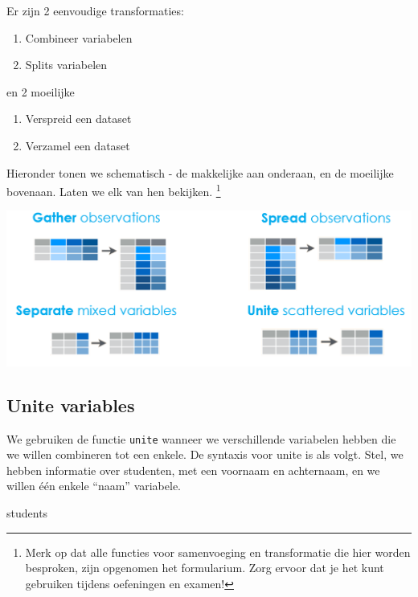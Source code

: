 \documentclass[]{tufte-book}
\newenvironment{Shaded}{}{}
\newcommand{\NormalTok}[1]{#1}
\providecommand{\tightlist}{%
  \setlength{\itemsep}{0pt}\setlength{\parskip}{0pt}}
\begin{document}
Er zijn 2 eenvoudige transformaties:

\begin{enumerate}
\def\labelenumi{\arabic{enumi}.}
\tightlist
\item
  Combineer variabelen
\item
  Splits variabelen
\end{enumerate}

en 2 moeilijke

\begin{enumerate}
\def\labelenumi{\arabic{enumi}.}
\setcounter{enumi}{2}
\tightlist
\item
  Verspreid een dataset
\item
  Verzamel een dataset
\end{enumerate}

Hieronder tonen we schematisch - de makkelijke aan onderaan, en de moeilijke bovenaan. Laten we elk van hen bekijken. \footnote{Merk op dat alle functies voor samenvoeging en transformatie die hier worden besproken, zijn opgenomen het formularium. Zorg ervoor dat je het kunt gebruiken tijdens oefeningen en examen!}

\includegraphics[width=1\linewidth]{images/operations2}

\hypertarget{unite-variables}{%
\subsection{Unite variables}\label{unite-variables}}

We gebruiken de functie \texttt{unite} wanneer we verschillende variabelen hebben die we willen combineren tot een enkele. De syntaxis voor unite is als volgt. Stel, we hebben informatie over studenten, met een voornaam en achternaam, en we willen één enkele ``naam'' variabele.

\begin{Shaded}
\begin{Highlighting}[]
\NormalTok{students}
\end{Highlighting}
\end{Shaded}
\end{document}
